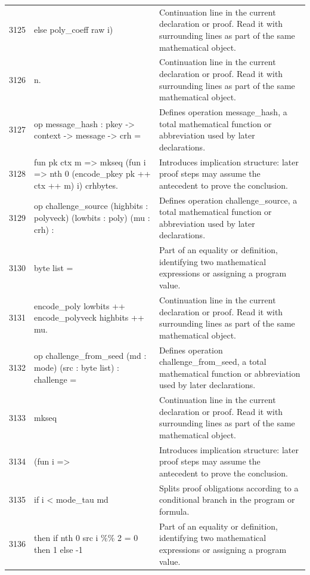 \documentclass[10pt]{article}
\begin{document}
\begin{longtable}{r L{0.53\textwidth} L{0.37\textwidth}}
3125 & {\ttfamily\scriptsize         else poly\_coeff raw i)} & Continuation line in the current declaration or proof.  Read it with surrounding lines as part of the same mathematical object. \\
3126 & {\ttfamily\scriptsize       n.} & Continuation line in the current declaration or proof.  Read it with surrounding lines as part of the same mathematical object. \\
3127 & {\ttfamily\scriptsize op message\_hash : pkey -> context -> message -> crh =} & Defines operation message\_hash, a total mathematical function or abbreviation used by later declarations. \\
3128 & {\ttfamily\scriptsize   fun pk ctx m => mkseq (fun i => nth 0 (encode\_pkey pk ++ ctx ++ m) i) crhbytes.} & Introduces implication structure: later proof steps may assume the antecedent to prove the conclusion. \\
3129 & {\ttfamily\scriptsize op challenge\_source (highbits : polyveck) (lowbits : poly) (mu : crh) :} & Defines operation challenge\_source, a total mathematical function or abbreviation used by later declarations. \\
3130 & {\ttfamily\scriptsize   byte list =} & Part of an equality or definition, identifying two mathematical expressions or assigning a program value. \\
3131 & {\ttfamily\scriptsize   encode\_poly lowbits ++ encode\_polyveck highbits ++ mu.} & Continuation line in the current declaration or proof.  Read it with surrounding lines as part of the same mathematical object. \\
3132 & {\ttfamily\scriptsize op challenge\_from\_seed (md : mode) (src : byte list) : challenge =} & Defines operation challenge\_from\_seed, a total mathematical function or abbreviation used by later declarations. \\
3133 & {\ttfamily\scriptsize   mkseq} & Continuation line in the current declaration or proof.  Read it with surrounding lines as part of the same mathematical object. \\
3134 & {\ttfamily\scriptsize     (fun i =>} & Introduces implication structure: later proof steps may assume the antecedent to prove the conclusion. \\
3135 & {\ttfamily\scriptsize       if i < mode\_tau md} & Splits proof obligations according to a conditional branch in the program or formula. \\
3136 & {\ttfamily\scriptsize       then if nth 0 src i \%\% 2 = 0 then 1 else -1} & Part of an equality or definition, identifying two mathematical expressions or assigning a program value. \\

\end{longtable}
\end{document}
